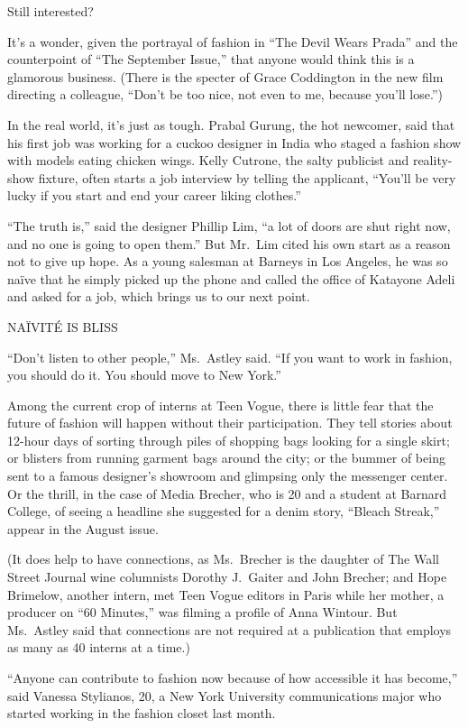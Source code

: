 ﻿\documentclass[12pt]{article}
\begin{document}
Still interested?

It's a wonder, given the portrayal of fashion in ``The Devil Wears Prada'' and the counterpoint of
``The September Issue,'' that anyone would think this is a glamorous business. (There is the specter
of Grace Coddington in the new film directing a colleague, ``Don't be too nice, not even to me,
because you'll lose.'')

In the real world, it's just as tough. Prabal Gurung, the hot newcomer, said that his first job was
working for a cuckoo designer in India who staged a fashion show with models eating chicken wings.
Kelly Cutrone, the salty publicist and reality-show fixture, often starts a job interview by telling
the applicant, ``You'll be very lucky if you start and end your career liking clothes.''

``The truth is,'' said the designer Phillip Lim, ``a lot of doors are shut right now, and no one is
going to open them.'' But Mr.~Lim cited his own start as a reason not to give up hope. As a young
salesman at Barneys in Los Angeles, he was so na\"ive that he simply picked up the phone and called
the office of Katayone Adeli and asked for a job, which brings us to our next point.

NAÏVITÉ IS BLISS

``Don't listen to other people,'' Ms.~Astley said. ``If you want to work in fashion, you should do
it. You should move to New York.''

Among the current crop of interns at Teen Vogue, there is little fear that the future of fashion
will happen without their participation. They tell stories about 12-hour days of sorting through
piles of shopping bags looking for a single skirt; or blisters from running garment bags around the
city; or the bummer of being sent to a famous designer's showroom and glimpsing only the messenger
center. Or the thrill, in the case of Media Brecher, who is 20 and a student at Barnard College, of
seeing a headline she suggested for a denim story, ``Bleach Streak,'' appear in the August issue.

(It does help to have connections, as Ms.~Brecher is the daughter of The Wall Street Journal wine
columnists Dorothy J.~Gaiter and John Brecher; and Hope Brimelow, another intern, met Teen Vogue
editors in Paris while her mother, a producer on ``60 Minutes,'' was filming a profile of Anna
Wintour. But Ms.~Astley said that connections are not required at a publication that employs as many
as 40 interns at a time.)

``Anyone can contribute to fashion now because of how accessible it has become,'' said Vanessa
Stylianos, 20, a New York University communications major who started working in the fashion closet
last month.
\end{document}
